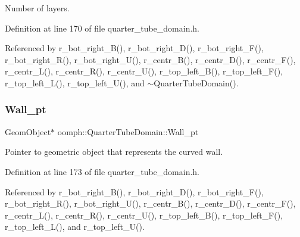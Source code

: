 Number of layers. 



Definition at line 170 of file quarter\+\_\+tube\+\_\+domain.\+h.



Referenced by r\+\_\+bot\+\_\+right\+\_\+\+B(), r\+\_\+bot\+\_\+right\+\_\+\+D(), r\+\_\+bot\+\_\+right\+\_\+\+F(), r\+\_\+bot\+\_\+right\+\_\+\+R(), r\+\_\+bot\+\_\+right\+\_\+\+U(), r\+\_\+centr\+\_\+\+B(), r\+\_\+centr\+\_\+\+D(), r\+\_\+centr\+\_\+\+F(), r\+\_\+centr\+\_\+\+L(), r\+\_\+centr\+\_\+\+R(), r\+\_\+centr\+\_\+\+U(), r\+\_\+top\+\_\+left\+\_\+\+B(), r\+\_\+top\+\_\+left\+\_\+\+F(), r\+\_\+top\+\_\+left\+\_\+\+L(), r\+\_\+top\+\_\+left\+\_\+\+U(), and $\sim$\+Quarter\+Tube\+Domain().

\mbox{\label{classoomph_1_1QuarterTubeDomain_af394493bc3c3b0f06d9f591e1d02c0f9}} 
\subsubsection{\texorpdfstring{Wall\+\_\+pt}{Wall\_pt}}
{\footnotesize\ttfamily Geom\+Object$\ast$ oomph\+::\+Quarter\+Tube\+Domain\+::\+Wall\+\_\+pt\hspace{0.3cm}{\ttfamily [private]}}



Pointer to geometric object that represents the curved wall. 



Definition at line 173 of file quarter\+\_\+tube\+\_\+domain.\+h.



Referenced by r\+\_\+bot\+\_\+right\+\_\+\+B(), r\+\_\+bot\+\_\+right\+\_\+\+D(), r\+\_\+bot\+\_\+right\+\_\+\+F(), r\+\_\+bot\+\_\+right\+\_\+\+R(), r\+\_\+bot\+\_\+right\+\_\+\+U(), r\+\_\+centr\+\_\+\+B(), r\+\_\+centr\+\_\+\+D(), r\+\_\+centr\+\_\+\+F(), r\+\_\+centr\+\_\+\+L(), r\+\_\+centr\+\_\+\+R(), r\+\_\+centr\+\_\+\+U(), r\+\_\+top\+\_\+left\+\_\+\+B(), r\+\_\+top\+\_\+left\+\_\+\+F(), r\+\_\+top\+\_\+left\+\_\+\+L(), and r\+\_\+top\+\_\+left\+\_\+\+U().

\mbox{\label{classoomph_1_1QuarterTubeDomain_ab28aec59a8756da42f74c0affb7276c2}} 
